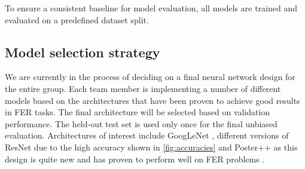 To ensure a consistent baseline for model evaluation, all models are trained and evaluated on a predefined dataset split. 

\subsection{Model selection strategy}

We are currently in the process of deciding on a final neural network design for the entire group.
Each team member is implementing a number of different models based on the architectures that have
been proven to achieve good results in FER tasks. The final architecture will be selected based on validation performance. The held-out test set is used only once for the final unbiased evaluation. Architectures of interest include GoogLeNet \cite{DBLP:journals/corr/SzegedyLJSRAEVR14},
different versions of ResNet due to the high accuracy shown in \ref{fig:accuracies} and Poster++ as this design is 
quite new and has proven to perform well on FER problems \cite{mao2023postersimplerstrongerfacial}.

